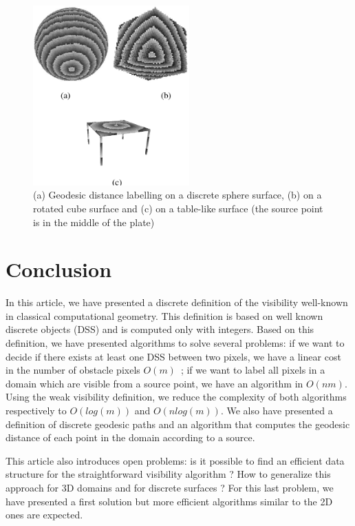 \documentclass[fleqn,twoside]{article}
\begin{document}
\begin{figure}[htb]
  \begin{center}
    \includegraphics[width=6cm]{surfaces}
   \caption{(a) Geodesic distance labelling on a discrete sphere
      surface, (b) on a  rotated  cube surface and (c) on a table-like
      surface (the source point is in the middle of the plate) }
  \label{surface_geodes3d}
\end{center}
\end{figure}
\section{Conclusion}

In  this  article, we   have presented a   discrete  definition of the
visibility  well-known in   classical  computational  geometry.   This
definition   is  based on well  known   discrete objects  (DSS) and is
computed   only  with integers.  Based on   this  definition,  we have
presented algorithms to  solve several problems: if  we want to decide
if there exists at least one DSS between two pixels,  we have a linear
cost in the number of obstacle pixels $O(m)$~; if we want to label all
pixels in a domain which are  visible from a  source point, we have an
algorithm in $O(nm)$.  Using the weak visibility definition, we reduce
the complexity of  both  algorithms  respectively to  $O(log(m))$  and
$O(nlog(m))$.    We also have   presented  a  definition   of discrete
geodesic paths and an algorithm  that computes the geodesic distance of
each point in the domain according to a source.

This article also introduces open problems:  is it possible to find an
efficient data structure for  the straightforward visibility algorithm
? How  to  generalize this approach  for 3D  domains and for  discrete
surfaces  ?   For this  last  problem, we have presented a first solution but
 more efficient algorithms similar to the 2D ones  are expected.




 
\end{document}
